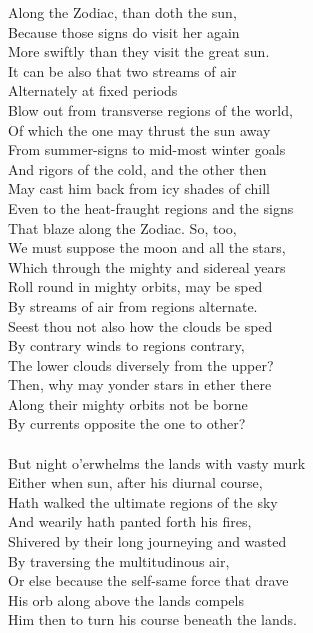 Along the Zodiac, than doth the sun,\\
Because those signs do visit her again\\
More swiftly than they visit the great sun.\\
It can be also that two streams of air\\
Alternately at fixed periods\\
Blow out from transverse regions of the world,\\
Of which the one may thrust the sun away\\
From summer-signs to mid-most winter goals\\
And rigors of the cold, and the other then\\
May cast him back from icy shades of chill\\
Even to the heat-fraught regions and the signs\\
That blaze along the Zodiac. So, too,\\
We must suppose the moon and all the stars,\\
Which through the mighty and sidereal years\\
Roll round in mighty orbits, may be sped\\
By streams of air from regions alternate.\\
Seest thou not also how the clouds be sped\\
By contrary winds to regions contrary,\\
The lower clouds diversely from the upper?\\
Then, why may yonder stars in ether there\\
Along their mighty orbits not be borne\\
By currents opposite the one to other?\\
\\
But night o'erwhelms the lands with vasty murk\\
Either when sun, after his diurnal course,\\
Hath walked the ultimate regions of the sky\\
And wearily hath panted forth his fires,\\
Shivered by their long journeying and wasted\\
By traversing the multitudinous air,\\
Or else because the self-same force that drave\\
His orb along above the lands compels\\
Him then to turn his course beneath the lands.\\
